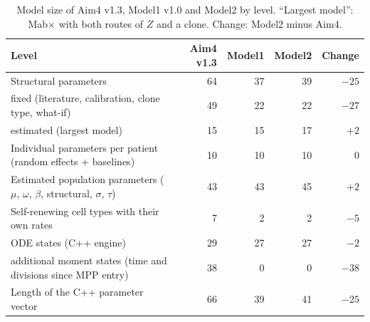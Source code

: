\begin{table}[!htbp]
\centering
\small
\setlength{\tabcolsep}{3.5pt}
\caption{Model size of Aim4 v1.3, Model1 v1.0 and Model2 by level. ``Largest model'': Mab$\times$ with both routes of $Z$ and a clone. Change: Model2 minus Aim4.}
\label{tab:levels}
\begin{tabular}{>{\raggedright\arraybackslash}p{8.2cm}rrrr}
\toprule
Level & Aim4 v1.3 & Model1 & Model2 & Change \\
\midrule
Structural parameters & 64 & 37 & 39 & $-25$ \\
\quad fixed (literature, calibration, clone type, what-if) & 49 & 22 & 22 & $-27$ \\
\quad estimated (largest model) & 15 & 15 & 17 & $+2$ \\
Individual parameters per patient (random effects + baselines) & 10 & 10 & 10 & 0 \\
Estimated population parameters ($\mu$, $\omega$, $\beta$, structural, $\sigma$, $\tau$) & 43 & 43 & 45 & $+2$ \\
Self-renewing cell types with their own rates & 7 & 2 & 2 & $-5$ \\
ODE states (C++ engine) & 29 & 27 & 27 & $-2$ \\
\quad additional moment states (time and divisions since MPP entry) & 38 & 0 & 0 & $-38$ \\
Length of the C++ parameter vector & 66 & 39 & 41 & $-25$ \\
\bottomrule
\end{tabular}
\end{table}
